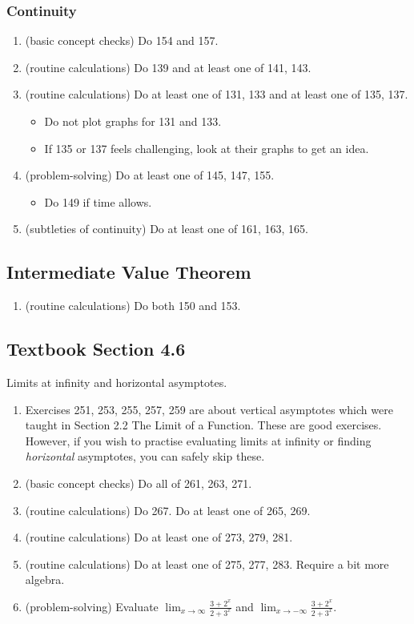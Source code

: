 \documentclass[../main.tex]{subfiles}
\begin{document}
\subsubsection*{Continuity}
\begin{enumerate}
  \item (basic concept checks) Do 154 and 157.
  \item (routine calculations) Do 139 and at least one of 141, 143.
  \item (routine calculations) Do at least one of 131, 133 and at least one of 135, 137.
    \begin{itemize}
      \item Do not plot graphs for 131 and 133.
      \item If 135 or 137 feels challenging, look at their graphs to get an idea.
    \end{itemize}
  \item (problem-solving) Do at least one of 145, 147, 155.
    \begin{itemize}
      \item Do 149 if time allows.
    \end{itemize}
  \item (subtleties of continuity) Do at least one of 161, 163, 165.
\end{enumerate}

\subsection*{Intermediate Value Theorem}
\begin{enumerate}
  \item (routine calculations) Do both 150 and 153.
\end{enumerate}

\clearpage
\subsection*{Textbook Section 4.6}

Limits at infinity and horizontal asymptotes.
\begin{enumerate}
  \item[*] Exercises 251, 253, 255, 257, 259 are about vertical asymptotes which were taught in Section 2.2 The Limit of a Function. These are good exercises. However, if you wish to practise evaluating limits at infinity or finding \emph{horizontal} asymptotes, you can safely skip these.
  \item (basic concept checks) Do all of 261, 263, 271.
  \item (routine calculations) Do 267. Do at least one of 265, 269.
  \item (routine calculations) Do at least one of 273, 279, 281.
  \item (routine calculations) Do at least one of 275, 277, 283. Require a bit more algebra.
  \item (problem-solving) Evaluate \(\lim_{x \to \infty} \frac{3 + 2^{x}}{2 + 3^{x}}\) and \(\lim_{x \to -\infty} \frac{3 + 2^{x}}{2 + 3^{x}}\).
\end{enumerate}
\end{document}
